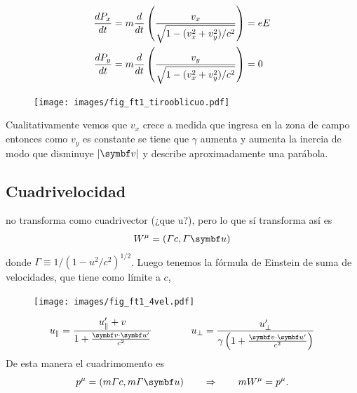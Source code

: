 \documentclass[10pt,oneside]{CBFT_book}
\begin{document}
\begin{align*}
 \frac{d^{\hspace{-0.05em}} {P_x}}{d {t}^{\hspace{-0.05em}}} &= m \frac{d^{\hspace{-0.05em}} {}}{d {t}^{\hspace{-0.05em}}}\left( \frac{v_x}{ \sqrt{ 1 - (v_x^2 + v_y^2)/c^2 } }\right) = eE \\
 \frac{d^{\hspace{-0.05em}} {P_y}}{d {t}^{\hspace{-0.05em}}} &= m \frac{d^{\hspace{-0.05em}} {}}{d {t}^{\hspace{-0.05em}}}\left( \frac{v_y}{ \sqrt{ 1 - (v_x^2 + v_y^2)/c^2 } }\right) =0 \\
\end{align*}


\begin{figure}[htb]
	\begin{center}
	\texttt{[image: images/fig\_ft1\_tirooblicuo.pdf]}	 
	\end{center}
	\caption{}
\end{figure} 

Cualitativamente vemos que $v_x$ crece a medida que ingresa en la zona de campo  entonces como $v_y$ es
constante se tiene que $\gamma$ aumenta y aumenta la inercia de modo que disminuye $|\vb{v}|$ y describe
aproximadamente una parábola.

\subsection{Cuadrivelocidad}

 no transforma como cuadrivector (¿que u?), pero lo que sí transforma así es
\[
	W^\mu = ( \Gamma c , \Gamma \vb{u} ) 
\]
donde $ \Gamma \equiv 1/( 1 - u^2/c^2)^{1/2}$. Luego tenemos la fórmula de Einstein de suma de velocidades,
que tiene como límite a $c$,

\begin{figure}[htb]
	\begin{center}
	\texttt{[image: images/fig\_ft1\_4vel.pdf]}	 
	\end{center}
	\caption{}
\end{figure} 

\[
	u_\parallel = \frac{ u'_\parallel + v}{ 1 + \frac{\pe{v}{u'}}{c^2} } \qquad \qquad 
	u_\perp = \frac{ u'_\perp}{\gamma\left(1 + \frac{\pe{v}{u'}}{c^2}\right)}
\]
De esta manera el cuadrimomento es 
\[
	p^\mu = ( m\Gamma c, m \Gamma \vb{u}) \qquad \Rightarrow \qquad m W^\mu = p^\mu.
\]

\end{document}

